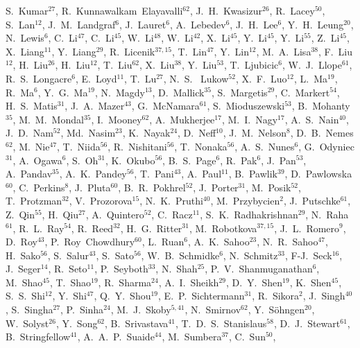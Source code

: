 {S.~Kumar$^{27}$,
R.~Kunnawalkam~Elayavalli$^{62}$,
J.~H.~Kwasizur$^{26}$,
R.~Lacey$^{50}$,
S.~Lan$^{12}$,
J.~M.~Landgraf$^{6}$,
J.~Lauret$^{6}$,
A.~Lebedev$^{6}$,
J.~H.~Lee$^{6}$,
Y.~H.~Leung$^{20}$,
N.~Lewis$^{6}$,
C.~Li$^{47}$,
C.~Li$^{45}$,
W.~Li$^{48}$,
W.~Li$^{42}$,
X.~Li$^{45}$,
Y.~Li$^{45}$,
Y.~Li$^{55}$,
Z.~Li$^{45}$,
X.~Liang$^{11}$,
Y.~Liang$^{29}$,
R.~Licenik$^{37,15}$,
T.~Lin$^{47}$,
Y.~Lin$^{12}$,
M.~A.~Lisa$^{38}$,
F.~Liu$^{12}$,
H.~Liu$^{26}$,
H.~Liu$^{12}$,
T.~Liu$^{62}$,
X.~Liu$^{38}$,
Y.~Liu$^{53}$,
T.~Ljubicic$^{6}$,
W.~J.~Llope$^{61}$,
R.~S.~Longacre$^{6}$,
E.~Loyd$^{11}$,
T.~Lu$^{27}$,
N.~S.~ Lukow$^{52}$,
X.~F.~Luo$^{12}$,
L.~Ma$^{19}$,
R.~Ma$^{6}$,
Y.~G.~Ma$^{19}$,
N.~Magdy$^{13}$,
D.~Mallick$^{35}$,
S.~Margetis$^{29}$,
C.~Markert$^{54}$,
H.~S.~Matis$^{31}$,
J.~A.~Mazer$^{43}$,
G.~McNamara$^{61}$,
S.~Mioduszewski$^{53}$,
B.~Mohanty$^{35}$,
M.~M.~Mondal$^{35}$,
I.~Mooney$^{62}$,
A.~Mukherjee$^{17}$,
M.~I.~Nagy$^{17}$,
A.~S.~Nain$^{40}$,
J.~D.~Nam$^{52}$,
Md.~Nasim$^{23}$,
K.~Nayak$^{24}$,
D.~Neff$^{10}$,
J.~M.~Nelson$^{8}$,
D.~B.~Nemes$^{62}$,
M.~Nie$^{47}$,
T.~Niida$^{56}$,
R.~Nishitani$^{56}$,
T.~Nonaka$^{56}$,
A.~S.~Nunes$^{6}$,
G.~Odyniec$^{31}$,
A.~Ogawa$^{6}$,
S.~Oh$^{31}$,
K.~Okubo$^{56}$,
B.~S.~Page$^{6}$,
R.~Pak$^{6}$,
J.~Pan$^{53}$,
A.~Pandav$^{35}$,
A.~K.~Pandey$^{56}$,
T.~Pani$^{43}$,
A.~Paul$^{11}$,
B.~Pawlik$^{39}$,
D.~Pawlowska$^{60}$,
C.~Perkins$^{8}$,
J.~Pluta$^{60}$,
B.~R.~Pokhrel$^{52}$,
J.~Porter$^{31}$,
M.~Posik$^{52}$,
T.~Protzman$^{32}$,
V.~Prozorova$^{15}$,
N.~K.~Pruthi$^{40}$,
M.~Przybycien$^{2}$,
J.~Putschke$^{61}$,
Z.~Qin$^{55}$,
H.~Qiu$^{27}$,
A.~Quintero$^{52}$,
C.~Racz$^{11}$,
S.~K.~Radhakrishnan$^{29}$,
N.~Raha$^{61}$,
R.~L.~Ray$^{54}$,
R.~Reed$^{32}$,
H.~G.~Ritter$^{31}$,
M.~Robotkova$^{37,15}$,
J.~L.~Romero$^{9}$,
D.~Roy$^{43}$,
P.~Roy~Chowdhury$^{60}$,
L.~Ruan$^{6}$,
A.~K.~Sahoo$^{23}$,
N.~R.~Sahoo$^{47}$,
H.~Sako$^{56}$,
S.~Salur$^{43}$,
S.~Sato$^{56}$,
W.~B.~Schmidke$^{6}$,
N.~Schmitz$^{33}$,
F-J.~Seck$^{16}$,
J.~Seger$^{14}$,
R.~Seto$^{11}$,
P.~Seyboth$^{33}$,
N.~Shah$^{25}$,
P.~V.~Shanmuganathan$^{6}$,
M.~Shao$^{45}$,
T.~Shao$^{19}$,
R.~Sharma$^{24}$,
A.~I.~Sheikh$^{29}$,
D.~Y.~Shen$^{19}$,
K.~Shen$^{45}$,
S.~S.~Shi$^{12}$,
Y.~Shi$^{47}$,
Q.~Y.~Shou$^{19}$,
E.~P.~Sichtermann$^{31}$,
R.~Sikora$^{2}$,
J.~Singh$^{40}$,
S.~Singha$^{27}$,
P.~Sinha$^{24}$,
M.~J.~Skoby$^{5,41}$,
N.~Smirnov$^{62}$,
Y.~S\"{o}hngen$^{20}$,
W.~Solyst$^{26}$,
Y.~Song$^{62}$,
B.~Srivastava$^{41}$,
T.~D.~S.~Stanislaus$^{58}$,
D.~J.~Stewart$^{61}$,
B.~Stringfellow$^{41}$,
A.~A.~P.~Suaide$^{44}$,
M.~Sumbera$^{37}$,
C.~Sun$^{50}$,
}
